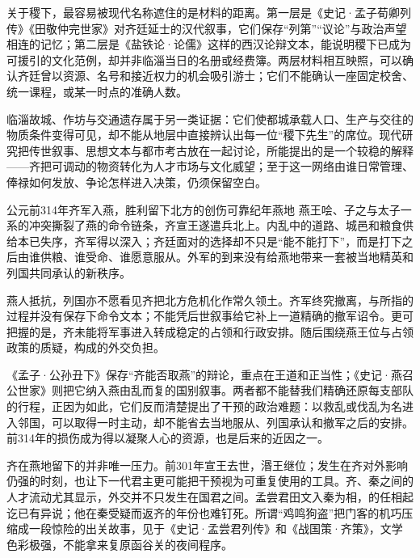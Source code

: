 \begin{debate}
关于稷下，最容易被现代名称遮住的是材料的距离。第一层是《史记·孟子荀卿列传》《田敬仲完世家》对齐廷延士的汉代叙事，它们保存“列第”“议论”与政治声望相连的记忆；第二层是《盐铁论·论儒》这样的西汉论辩文本，能说明稷下已成为可援引的文化范例，却并非临淄当日的名册或经费簿。两层材料相互映照，可以确认齐廷曾以资源、名号和接近权力的机会吸引游士；它们不能确认一座固定校舍、统一课程，或某一时点的准确人数。

临淄故城、作坊与交通遗存属于另一类证据：它们使都城承载人口、生产与交往的物质条件变得可见，却不能从地层中直接辨认出每一位“稷下先生”的席位。现代研究把传世叙事、思想文本与都市考古放在一起讨论，所能提出的是一个较稳的解释——齐把可调动的物资转化为人才市场与文化威望；至于这一网络由谁日常管理、俸禄如何发放、争论怎样进入决策，仍须保留空白。
\end{debate}

\begin{event}{公元前314年}{齐军入燕，胜利留下北方的创伤}{可靠纪年}{燕地}
燕王哙、子之与太子一系的冲突撕裂了燕的命令链条，齐宣王遂遣兵北上。内乱中的道路、城邑和粮食供给本已失序，齐军得以深入；齐廷面对的选择却不只是“能不能打下”，而是打下之后由谁供粮、谁受命、谁愿意服从。外军的到来没有给燕地带来一套被当地精英和列国共同承认的新秩序。

燕人抵抗，列国亦不愿看见齐把北方危机化作常久领土。齐军终究撤离，与所指的过程并没有保存下命令文本；不能凭后世叙事给它补上一道精确的撤军诏令。更可把握的是，齐未能将军事进入转成稳定的占领和行政安排。随后围绕燕王位与占领政策的质疑，构成的外交负担。

《孟子·公孙丑下》保存“齐能否取燕”的辩论，重点在王道和正当性；《史记·燕召公世家》则把它纳入燕由乱而复的国别叙事。两者都不能替我们精确还原每支部队的行程，正因为如此，它们反而清楚提出了干预的政治难题：以救乱或伐乱为名进入邻国，可以取得一时主动，却不能省去当地服从、列国承认和撤军之后的安排。前314年的损伤成为得以凝聚人心的资源，也是后来的近因之一。
\end{event}

齐在燕地留下的并非唯一压力。前301年宣王去世，湣王继位；发生在齐对外影响仍强的时刻，也让下一代君主更可能把干预视为可重复使用的工具。齐、秦之间的人才流动尤其显示，外交并不只发生在国君之间。孟尝君田文入秦为相，的任相起讫已有异说；他在秦受疑而返齐的年份也难钉死。所谓“鸡鸣狗盗”把门客的机巧压缩成一段惊险的出关故事，见于《史记·孟尝君列传》和《战国策·齐策》，文学色彩极强，不能拿来复原函谷关的夜间程序。

